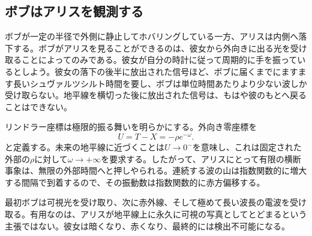 \begin{classroomqa}
\end{classroomqa}

\begin{classroomqa}
\end{classroomqa}

\subsection{ボブはアリスを観測する}

ボブが一定の半径で外側に静止してホバリングしている一方、アリスは内側へ落下する。ボブがアリスを見ることができるのは、彼女から外向きに出る光を受け取ることによってのみである。彼女が自分の時計に従って周期的に手を振っているとしよう。彼女の落下の後半に放出された信号ほど、ボブに届くまでにますます長いシュヴァルツシルト時間を要し、ボブは単位時間あたりより少ない波しか受け取らない。地平線を横切った後に放出された信号は、もはや彼のもとへ戻ることはできない。

リンドラー座標は極限的振る舞いを明らかにする。外向き零座標を
\begin{equation}
U=T-X=-\rho e^{-\omega}.
\end{equation}
と定義する。未来の地平線に近づくことは\(U\to0^{-}\)を意味し、これは固定された外部の\(\rho\)に対して\(\omega\to+\infty\)を要求する。したがって、アリスにとって有限の横断事象は、無限の外部時間へと押しやられる。連続する波の山は指数関数的に増大する間隔で到着するので、その振動数は指数関数的に赤方偏移する。

最初ボブは可視光を受け取り、次に赤外線、そして極めて長い波長の電波を受け取る。有用なのは、アリスが地平線上に永久に可視の写真としてとどまるという主張ではない。彼女は暗くなり、赤くなり、最終的には検出不可能になる。

\begin{classroomqa}
\end{classroomqa}

